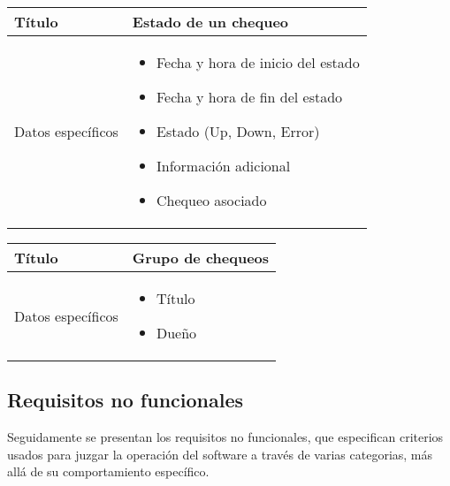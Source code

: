 \begin{center}
  
  \begin{tabularx}{\textwidth}{|l|X|}
    \hline

    Título & Estado de un chequeo \\

    \hline
    Datos específicos &

    \begin{itemize}
    \item Fecha y hora de inicio del estado
    \item Fecha y hora de fin del estado
    \item Estado (Up, Down, Error)
    \item Información adicional
    \item Chequeo asociado
    \end{itemize}
    \\
    
    \hline
    
  \end{tabularx}
\end{center}

\begin{center}
  
  \begin{tabularx}{\textwidth}{|l|X|}
    \hline

    Título & Grupo de chequeos \\

    \hline
    Datos específicos &

    \begin{itemize}
      \item Título
      \item Dueño
    \end{itemize}
    \\
    
    \hline
    
  \end{tabularx}
\end{center}

\FloatBarrier
\subsection{Requisitos no funcionales}

Seguidamente se presentan los requisitos no funcionales, que especifican
criterios usados para juzgar la operación del software a través de varias
categorias, más allá de su comportamiento específico.

